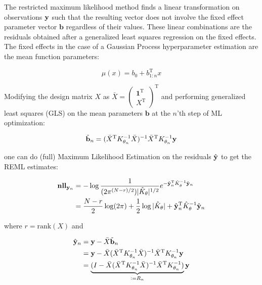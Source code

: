The restricted maximum likelihood method finds a linear transformation on observations $\mathbf{y}$ such that the resulting vector does not involve the fixed effect parameter vector $\mathbf{b}$ regardless of their values. These linear combinations are the residuals obtained after a generalized least squares regression on the fixed effects. The fixed effects in the case of a Gaussian Process hyperparameter estimation are the mean function parameters:

\begin{equation}
\mu(x) = b_{0} + b_{1:n}^{\mathrm{T}}x \label{mean}
\end{equation}

Modifying the design matrix $X$ as 
$\bar{X} = 
\left(
\begin{array}{ccc}
\mathbf{1}^{\mathrm{T}} \\
X^{\mathrm{T}}
\end{array}
\right)^{\mathrm{T}}$
and performing generalized least squares (GLS) on the mean parameters $\mathbf{b}$ at the $n$'th step of ML optimization:

\begin{equation}
\tilde{\mathbf{b}}_{n} = (\bar{X}^{\mathrm{T}}K_{\theta_{n}}^{-1}\bar{X})^{-1}\bar{X}^{\mathrm{T}}K_{\theta_{n}}^{-1}\mathbf{y} \label{GLS}
\end{equation}

one can do (full) Maximum Likelihood Estimation on the residuals $\hat{\mathbf{y}}$ to get the REML estimates:

\begin{align}
\textbf{nll}_{\mathbf{y}_{n}} &= - \log \frac{1}{(2\pi^{(N-r)/2})|\hat{K}_{\theta}|^{1/2}}e^{-\hat{\mathbf{y}}_{n}^{\mathrm{T}}\hat{K}_{\theta}^{-1}\hat{\mathbf{y}}_{n}} \\
&= \frac{N-r}{2}\log(2\pi) + \frac{1}{2}\log|\hat{K}_{\theta}| + \hat{\mathbf{y}}_{n}^{\mathrm{T}} \hat{K}_{\theta}^{-1} \hat{\mathbf{y}}_{n}
\label{nll_reml}
\end{align}

where $r = \text{rank}(X)$ and

\begin{align}
\hat{\mathbf{y}}_{n} &= \mathbf{y} - \bar{X}\tilde{\mathbf{b}}_{n} \\
&= \mathbf{y} - \bar{X}(\bar{X}^{\mathrm{T}}K_{\theta_{n}}^{-1}\bar{X})^{-1}\bar{X}^{\mathrm{T}}K_{\theta_{n}}^{-1}\mathbf{y} \\
&= \underbrace{(I -\bar{X} (\bar{X}^{\mathrm{T}}K_{\theta_{n}}^{-1}\bar{X})^{-1}\bar{X}^{\mathrm{T}}K_{\theta_{n}}^{-1})}_{\mathrel{\mathop:}= R_{n}}\mathbf{y} 
\end{align}

